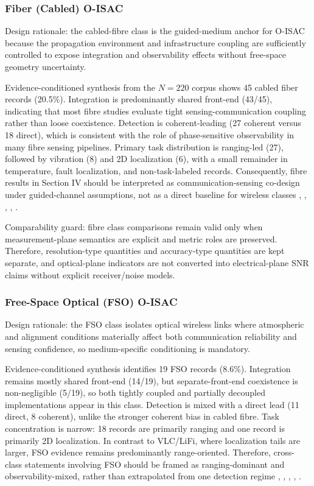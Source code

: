 \subsubsection{Fiber (Cabled) O-ISAC}
Design rationale: the cabled-fibre class is the guided-medium anchor for O-ISAC because the propagation environment and infrastructure coupling are sufficiently controlled to expose integration and observability effects without free-space geometry uncertainty.

Evidence-conditioned synthesis from the $N=220$ corpus shows 45 cabled fiber records (20.5\%). Integration is predominantly shared front-end (43/45), indicating that most fibre studies evaluate tight sensing-communication coupling rather than loose coexistence. Detection is coherent-leading (27 coherent versus 18 direct), which is consistent with the role of phase-sensitive observability in many fibre sensing pipelines. Primary task distribution is ranging-led (27), followed by vibration (8) and 2D localization (6), with a small remainder in temperature, fault localization, and non-task-labeled records. Consequently, fibre results in Section IV should be interpreted as communication-sensing co-design under guided-channel assumptions, not as a direct baseline for wireless classes \cite{O_ISAC_006}, \cite{O_ISAC_033}, \cite{O_ISAC_046}, \cite{O_ISAC_041}, \cite{O_ISAC_090}.

Comparability guard: fibre class comparisons remain valid only when measurement-plane semantics are explicit and metric roles are preserved. Therefore, resolution-type quantities and accuracy-type quantities are kept separate, and optical-plane indicators are not converted into electrical-plane SNR claims without explicit receiver/noise models.

\subsubsection{Free-Space Optical (FSO) O-ISAC}
Design rationale: the FSO class isolates optical wireless links where atmospheric and alignment conditions materially affect both communication reliability and sensing confidence, so medium-specific conditioning is mandatory.

Evidence-conditioned synthesis identifies 19 FSO records (8.6\%). Integration remains mostly shared front-end (14/19), but separate-front-end coexistence is non-negligible (5/19), so both tightly coupled and partially decoupled implementations appear in this class. Detection is mixed with a direct lead (11 direct, 8 coherent), unlike the stronger coherent bias in cabled fibre. Task concentration is narrow: 18 records are primarily ranging and one record is primarily 2D localization. In contrast to VLC/LiFi, where localization tails are larger, FSO evidence remains predominantly range-oriented. Therefore, cross-class statements involving FSO should be framed as ranging-dominant and observability-mixed, rather than extrapolated from one detection regime \cite{O_ISAC_021}, \cite{O_ISAC_035}, \cite{O_ISAC_005}, \cite{O_ISAC_023}, \cite{O_ISAC_199}.

